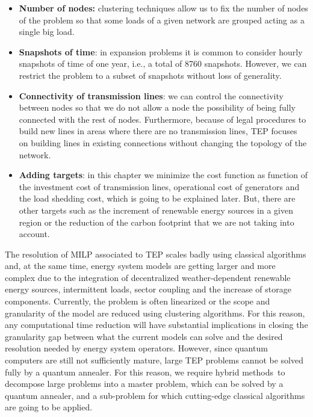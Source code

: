 \begin{itemize}
    \item \textbf{Number of nodes:} clustering techniques allow us to fix the number of nodes of the problem so that some loads of a given network are grouped acting as a single big load.
    \item \textbf{Snapshots of time}: in expansion problems it is common to consider hourly snapshots of time of one year, i.e., a total of 8760 snapshots. However, we can restrict the problem to a subset of snapshots without loss of generality.
    \item \textbf{Connectivity of transmission lines}: we can control the connectivity between nodes so that we do not allow a node the possibility of being fully connected with the rest of nodes. Furthermore, because of legal procedures to build new lines in areas where there are no transmission lines, TEP focuses on building lines in existing connections without changing the topology of the network.
    \item \textbf{Adding targets}: in this chapter we minimize the cost function as function of the investment cost of transmission lines, operational cost of generators and the load shedding cost, which is going to be explained later. But, there are other targets such as the increment of renewable energy sources in a given region or the reduction of the carbon footprint that we are not taking into account.
\end{itemize}
The resolution of MILP associated to TEP scales badly using classical algorithms\,\cite{Oertel2014ComplexityEvaluation} and, at the same time, energy system models are getting larger and more complex due to the integration of decentralized weather-dependent renewable energy sources, intermittent loads, sector coupling and the increase of storage components. Currently, the problem is often linearized or the scope and granularity of the model are reduced using clustering algorithms. For this reason, any computational time reduction will have substantial implications in closing the granularity gap between what the current models can solve and the desired resolution needed by energy system operators. However,  since quantum computers are still not sufficiently mature, large TEP problems cannot be solved fully by a quantum annealer. For this reason, we require hybrid methods\,\cite{Dilwali2016,Binato2001,Huang2019,MacRae2016,Zhao2021HybridProgrammingb} to decompose large problems into a master problem, which can be solved by a quantum annealer, and a sub-problem for which cutting-edge classical algorithms are going to be applied.
